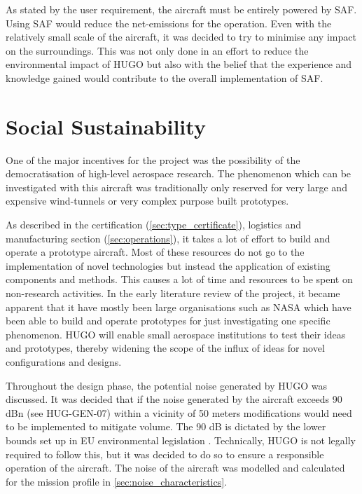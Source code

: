 As stated by the user requirement, the aircraft must be entirely powered by SAF. Using SAF would reduce the net-emissions for the operation. Even with the relatively small scale of the aircraft, it was decided to try to minimise any impact on the surroundings. This was not only done in an effort to reduce the environmental impact of HUGO but also with the belief that the experience and knowledge gained would contribute to the overall implementation of SAF. 


\section{Social Sustainability}
\label{sec:social_sustainability}

One of the major incentives for the project was the possibility of the democratisation of high-level aerospace research. The phenomenon which can be investigated with this aircraft was traditionally only reserved for very large and expensive wind-tunnels or very complex purpose built prototypes.

As described in the certification (\autoref{sec:type_certificate}), logistics and manufacturing section (\autoref{sec:operations}), it takes a lot of effort to build and operate a prototype aircraft. Most of these resources do not go to the implementation of novel technologies but instead the application of existing components and methods. This causes a lot of time and resources to be spent on non-research activities. In the early literature review of the project, it became apparent that it have mostly been large organisations such as NASA which have been able to build and operate prototypes for just investigating one specific phenomenon. HUGO will enable small aerospace institutions to test their ideas and prototypes, thereby widening the scope of the influx of ideas for novel configurations and designs.  
 

Throughout the design phase, the potential noise generated by HUGO was discussed. It was decided that if the noise generated by the aircraft exceeds 90 dBn (see HUG-GEN-07) within a vicinity of 50 meters modifications would need to be implemented to mitigate volume. The 90 dB is dictated by the lower bounds set up in EU environmental legislation \cite{ICAO_Annex16_Vol1_2017}. Technically, HUGO is not legally required to follow this, but it was decided to do so to ensure a responsible operation of the aircraft. The noise of the aircraft was modelled and calculated for the mission profile in \autoref{sec:noise_characteristics}. 

